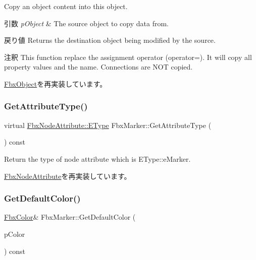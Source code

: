 Copy an object content into this object. 
\begin{DoxyParams}{引数}
{\em p\+Object} & The source object to copy data from. \\
\hline
\end{DoxyParams}
\begin{DoxyReturn}{戻り値}
Returns the destination object being modified by the source. 
\end{DoxyReturn}
\begin{DoxyRemark}{注釈}
This function replace the assignment operator (operator=). It will copy all property values and the name. Connections are N\+OT copied. 
\end{DoxyRemark}


\hyperlink{class_fbx_object_a0c0c5adb38284d14bb82c04d54504a3e}{Fbx\+Object}を再実装しています。

\mbox{\label{class_fbx_marker_a46b62e421142c41e188a62ab3963493c}} 
\subsubsection{\texorpdfstring{Get\+Attribute\+Type()}{GetAttributeType()}}
{\footnotesize\ttfamily virtual \hyperlink{class_fbx_node_attribute_a08e1669d3d1a696910756ab17de56d6a}{Fbx\+Node\+Attribute\+::\+E\+Type} Fbx\+Marker\+::\+Get\+Attribute\+Type (\begin{DoxyParamCaption}{ }\end{DoxyParamCaption}) const\hspace{0.3cm}{\ttfamily [virtual]}}



Return the type of node attribute which is E\+Type\+::e\+Marker. 



\hyperlink{class_fbx_node_attribute_a1c2116756906127145a2b8721fc26752}{Fbx\+Node\+Attribute}を再実装しています。

\mbox{\label{class_fbx_marker_a19aa5a522e77d2cbad7f5d4f6b382154}} 
\subsubsection{\texorpdfstring{Get\+Default\+Color()}{GetDefaultColor()}}
{\footnotesize\ttfamily \hyperlink{class_fbx_color}{Fbx\+Color}\& Fbx\+Marker\+::\+Get\+Default\+Color (\begin{DoxyParamCaption}\item[{\hyperlink{class_fbx_color}{Fbx\+Color} \&}]{p\+Color }\end{DoxyParamCaption}) const}

